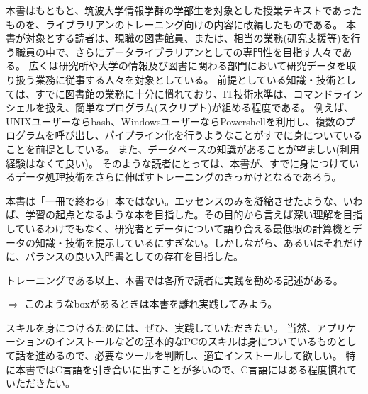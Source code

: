 本書はもともと、筑波大学情報学群の学部生を対象とした授業テキストであったものを、ライブラリアンのトレーニング向けの内容に改編したものである。
本書が対象とする読者は、現職の図書館員、または、相当の業務(研究支援等)を行う職員の中で、さらにデータライブラリアンとしての専門性を目指す人々である。
広くは研究所や大学の情報及び図書に関わる部門において研究データを取り扱う業務に従事する人々を対象としている。
前提としている知識・技術としては、すでに図書館の業務に十分に慣れており、IT技術水準は、コマンドラインシェルを扱え、簡単なプログラム(スクリプト)が組める程度である。
例えば、UNIXユーザーならbash、WindowsユーザーならPowershellを利用し、複数のプログラムを呼び出し、パイプライン化を行うようなことがすでに身についていることを前提としている。
また、データベースの知識があることが望ましい(利用経験はなくて良い)。
そのような読者にとっては、本書が、すでに身につけているデータ処理技術をさらに伸ばすトレーニングのきっかけとなるであろう。

本書は「一冊で終わる」本ではない。エッセンスのみを凝縮させたような、いわば、学習の起点となるような本を目指した。その目的から言えば深い理解を目指しているわけでもなく、研究者とデータについて語り合える最低限の計算機とデータの知識・技術を提示しているにすぎない。しかしながら、あるいはそれだけに、バランスの良い入門書としての存在を目指した。

トレーニングである以上、本書では各所で読者に実践を勧める記述がある。
\begin{breakbox}$\Rightarrow$
このようなboxがあるときは本書を離れ実践してみよう。
\end{breakbox}
\noindent{}スキルを身につけるためには、ぜひ、実践していただきたい。
当然、アプリケーションのインストールなどの基本的なPCのスキルは身についているものとして話を進めるので、必要なツールを判断し、適宜インストールして欲しい。
特に本書ではC言語を引き合いに出すことが多いので、C言語にはある程度慣れていただきたい。
